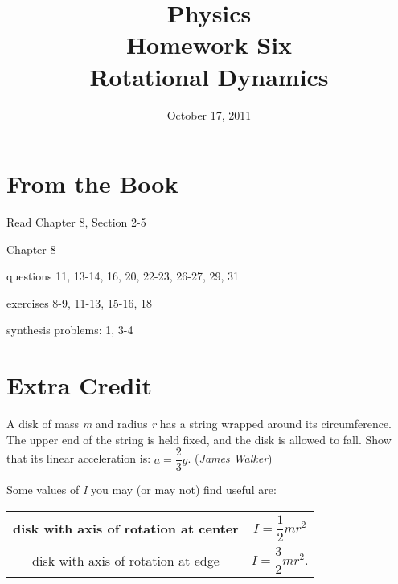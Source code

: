 \documentclass{exam}
\title{Physics \\ Homework Six \\ Rotational Dynamics}
\date{October 17, 2011}
\begin{document}
\maketitle

\section{From the Book}

\begin{itemize*}
  \item Read Chapter 8, Section 2-5
  \item Chapter 8
    \begin{itemize*}
      \item questions 11, 13-14, 16, 20, 22-23, 26-27, 29, 31
      \item exercises 8-9, 11-13, 15-16, 18
      \item synthesis problems: 1, 3-4
    \end{itemize*}
\end{itemize*}

\section{Extra Credit}

A disk of mass {\em m} and radius {\em r} has a string wrapped around its circumference.  The upper end of the string is
held fixed, and the disk is allowed to fall.  Show that its linear acceleration is: $a = \dfrac{2}{3} g$.  ({\em James
  Walker})

\vspace{.1 in}

Some values of {\em I} you may (or may not) find useful are:

\vspace{.1 in}

\begin{tabular}{cc}
\toprule
disk with axis of rotation at center & $I = \dfrac{1}{2} mr^2$ \\
\midrule
disk with axis of rotation at edge & $I = \dfrac{3}{2} mr^2$. \\
\bottomrule
\end{tabular}
\end{document}
